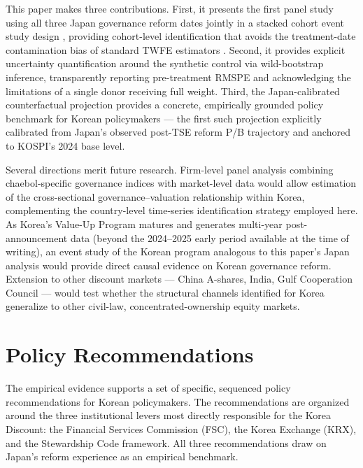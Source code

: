 \documentclass[12pt]{article}
\begin{document}
This paper makes three contributions. First, it presents the first panel study using all
three Japan governance reform dates jointly in a stacked cohort event study design
\citep{cengiz2019}, providing cohort-level identification that avoids the treatment-date
contamination bias of standard TWFE estimators \citep{baker2022}. Second, it provides
explicit uncertainty quantification around the synthetic control via wild-bootstrap
inference, transparently reporting pre-treatment RMSPE and acknowledging the limitations
of a single donor receiving full weight. Third, the Japan-calibrated counterfactual
projection provides a concrete, empirically grounded policy benchmark for Korean policymakers
--- the first such projection explicitly calibrated from Japan's observed post-TSE reform
P/B trajectory and anchored to KOSPI's 2024 base level.

Several directions merit future research. Firm-level panel analysis combining chaebol-specific
governance indices with market-level data would allow estimation of the cross-sectional
governance--valuation relationship within Korea, complementing the country-level time-series
identification strategy employed here. As Korea's Value-Up Program matures and generates
multi-year post-announcement data (beyond the 2024--2025 early period available at the time
of writing), an event study of the Korean program analogous to this paper's Japan analysis
would provide direct causal evidence on Korean governance reform. Extension to other
discount markets --- China A-shares, India, Gulf Cooperation Council --- would test whether
the structural channels identified for Korea generalize to other civil-law, concentrated-ownership
equity markets.

\section{Policy Recommendations}
\label{sec:policy}

The empirical evidence supports a set of specific, sequenced policy recommendations for
Korean policymakers. The recommendations are organized around the three institutional levers
most directly responsible for the Korea Discount: the Financial Services Commission (FSC),
the Korea Exchange (KRX), and the Stewardship Code framework. All three recommendations
draw on Japan's reform experience as an empirical benchmark.
\end{document}

